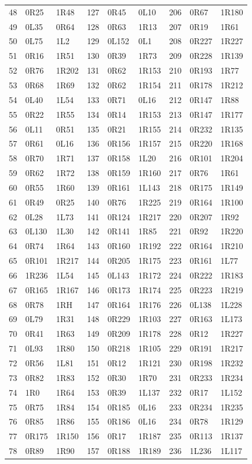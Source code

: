 \begin{longtable}{rll@{\hspace{1.3em}}rll@{\hspace{1.3em}}rll}
48 & 0R25 & 1R48 & 127 & 0R45 & 0L10 & 206 & 0R67 & 1R180\\
49 & 0L35 & 0R64 & 128 & 0R63 & 1R13 & 207 & 0R19 & 1R61\\
50 & 0L75 & 1L2 & 129 & 0L152 & 0L1 & 208 & 0R227 & 1R227\\
51 & 0R16 & 1R51 & 130 & 0R39 & 1R73 & 209 & 0R228 & 1R139\\
52 & 0R76 & 1R202 & 131 & 0R62 & 1R153 & 210 & 0R193 & 1R77\\
53 & 0R68 & 1R69 & 132 & 0R62 & 1R154 & 211 & 0R178 & 1R212\\
54 & 0L40 & 1L54 & 133 & 0R71 & 0L16 & 212 & 0R147 & 1R88\\
55 & 0R22 & 1R55 & 134 & 0R14 & 1R153 & 213 & 0R147 & 1R177\\
56 & 0L11 & 0R51 & 135 & 0R21 & 1R155 & 214 & 0R232 & 1R135\\
57 & 0R61 & 0L16 & 136 & 0R156 & 1R157 & 215 & 0R220 & 1R168\\
58 & 0R70 & 1R71 & 137 & 0R158 & 1L20 & 216 & 0R101 & 1R204\\
59 & 0R62 & 1R72 & 138 & 0R159 & 1R160 & 217 & 0R76 & 1R61\\
60 & 0R55 & 1R60 & 139 & 0R161 & 1L143 & 218 & 0R175 & 1R149\\
61 & 0R49 & 0R25 & 140 & 0R76 & 1R225 & 219 & 0R164 & 1R100\\
62 & 0L28 & 1L73 & 141 & 0R124 & 1R217 & 220 & 0R207 & 1R92\\
63 & 0L130 & 1L30 & 142 & 0R141 & 1R85 & 221 & 0R92 & 1R220\\
64 & 0R74 & 1R64 & 143 & 0R160 & 1R192 & 222 & 0R164 & 1R210\\
65 & 0R101 & 1R217 & 144 & 0R205 & 1R175 & 223 & 0R161 & 1L77\\
66 & 1R236 & 1L54 & 145 & 0L143 & 1R172 & 224 & 0R222 & 1R183\\
67 & 0R165 & 1R167 & 146 & 0R173 & 1R174 & 225 & 0R223 & 1R219\\
68 & 0R78 & 1RH & 147 & 0R164 & 1R176 & 226 & 0L138 & 1L228\\
69 & 0L79 & 1R31 & 148 & 0R229 & 1R103 & 227 & 0R163 & 1L173\\
70 & 0R41 & 1R63 & 149 & 0R209 & 1R178 & 228 & 0R12 & 1R227\\
71 & 0L93 & 1R80 & 150 & 0R218 & 1R105 & 229 & 0R191 & 1R217\\
72 & 0R56 & 1L81 & 151 & 0R12 & 1R121 & 230 & 0R198 & 1R232\\
73 & 0R82 & 1R83 & 152 & 0R30 & 1R70 & 231 & 0R233 & 1R234\\
74 & 1R0 & 1R64 & 153 & 0R39 & 1L137 & 232 & 0R17 & 1L152\\
75 & 0R75 & 1R84 & 154 & 0R185 & 0L16 & 233 & 0R234 & 1R235\\
76 & 0R85 & 1R86 & 155 & 0R186 & 0L16 & 234 & 0R78 & 1R129\\
77 & 0R175 & 1R150 & 156 & 0R17 & 1R187 & 235 & 0R113 & 1R137\\
78 & 0R89 & 1R90 & 157 & 0R188 & 1R189 & 236 & 1L236 & 1L117\\
\end{longtable}
\endgroup
